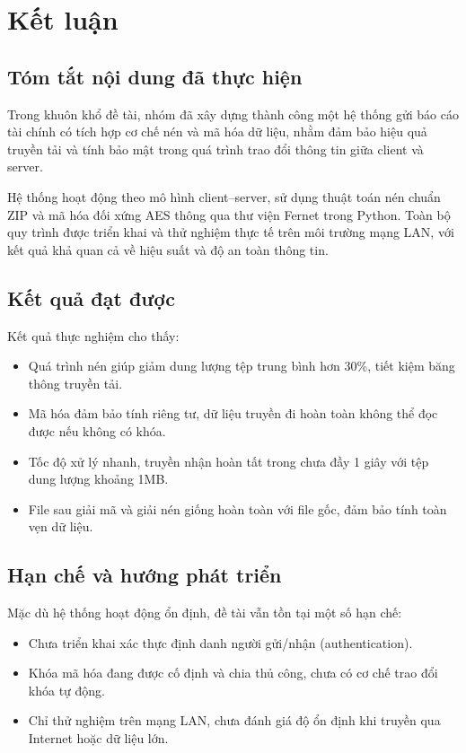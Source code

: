 \chapter{Kết luận}

\section{Tóm tắt nội dung đã thực hiện}

Trong khuôn khổ đề tài, nhóm đã xây dựng thành công một hệ thống gửi báo cáo tài chính có tích hợp cơ chế nén và mã hóa dữ liệu, nhằm đảm bảo hiệu quả truyền tải và tính bảo mật trong quá trình trao đổi thông tin giữa client và server.

Hệ thống hoạt động theo mô hình client–server, sử dụng thuật toán nén chuẩn ZIP và mã hóa đối xứng AES thông qua thư viện Fernet trong Python. Toàn bộ quy trình được triển khai và thử nghiệm thực tế trên môi trường mạng LAN, với kết quả khả quan cả về hiệu suất và độ an toàn thông tin.

\section{Kết quả đạt được}

Kết quả thực nghiệm cho thấy:

\begin{itemize}
  \item Quá trình nén giúp giảm dung lượng tệp trung bình hơn 30\%, tiết kiệm băng thông truyền tải.
  \item Mã hóa đảm bảo tính riêng tư, dữ liệu truyền đi hoàn toàn không thể đọc được nếu không có khóa.
  \item Tốc độ xử lý nhanh, truyền nhận hoàn tất trong chưa đầy 1 giây với tệp dung lượng khoảng 1MB.
  \item File sau giải mã và giải nén giống hoàn toàn với file gốc, đảm bảo tính toàn vẹn dữ liệu.
\end{itemize}

\section{Hạn chế và hướng phát triển}

Mặc dù hệ thống hoạt động ổn định, đề tài vẫn tồn tại một số hạn chế:

\begin{itemize}
  \item Chưa triển khai xác thực định danh người gửi/nhận (authentication).
  \item Khóa mã hóa đang được cố định và chia thủ công, chưa có cơ chế trao đổi khóa tự động.
  \item Chỉ thử nghiệm trên mạng LAN, chưa đánh giá độ ổn định khi truyền qua Internet hoặc dữ liệu lớn.
\end{itemize}


